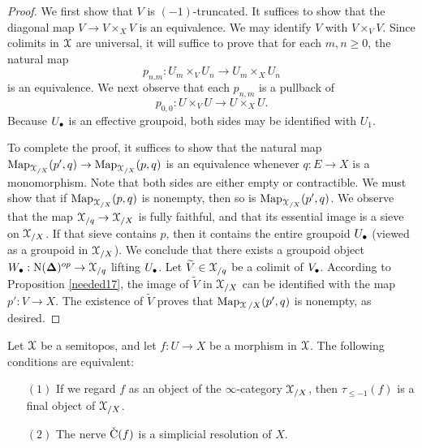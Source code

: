 \begin{proof}
We first show that $V$ is $(-1)$-truncated. It suffices to show
that the diagonal map $V \rightarrow V \times_{X} V$ is an
equivalence. We may identify $V$ with $V \times_{V} V$.
Since colimits in $\operatorname{\mathcal{X}}$ are universal, it will suffice to prove
that for each $m,n \geq 0$, the natural map
$$ p_{n.m}: U_m \times_{V} U_n \rightarrow U_{m} \times_{X} U_{n}$$
is an equivalence. We next observe that each $p_{n,m}$ is a pullback of
$$ p_{0,0}: U \times_{V} U \rightarrow U \times_{X} U. $$
Because $U_{\bullet}$ is an effective groupoid, both sides may be identified with $U_{1}$.

To complete the proof, it suffices to show that the natural map $\operatorname{{Map}}_{\operatorname{\mathcal{X}}_{/X}}(p',q)
\rightarrow \operatorname{{Map}}_{\operatorname{\mathcal{X}}_{/X}}(p,q)$ is an equivalence whenever $q: E \rightarrow X$
is a monomorphism. Note that both sides are either empty or contractible. We must show that
if $\operatorname{{Map}}_{\operatorname{\mathcal{X}}_{/X}}(p,q)$ is nonempty, then so is $\operatorname{{Map}}_{\operatorname{\mathcal{X}}_{/X}}(p',q)$. 
We observe that the map $\operatorname{\mathcal{X}}_{/q} \rightarrow \operatorname{\mathcal{X}}_{/X}$ is fully faithful, 
and that its essential image is a sieve on $\operatorname{\mathcal{X}}_{/X}$. If that sieve contains $p$, then
it contains the entire groupoid $U_{\bullet}$ (viewed as a groupoid in $\operatorname{\mathcal{X}}_{/X}$).
We conclude that there exists a groupoid object $W_{\bullet}: \operatorname{N}(\operatorname{{\bf \Delta}})^{op} \rightarrow \operatorname{\mathcal{X}}_{/q}$ lifting $U_{\bullet}$. Let $\widetilde{V} \in \operatorname{\mathcal{X}}_{/q}$ be a colimit of
$V_{\bullet}$. According to Proposition \ref{needed17}, the image of $\widetilde{V}$ in $\operatorname{\mathcal{X}}_{/X}$ can be identified with the map $p': V \rightarrow X$. The existence of $\widetilde{V}$ 
proves that $\operatorname{{Map}}_{\operatorname{\mathcal{X}}{/X}}(p',q)$ is nonempty, as desired.
\end{proof}

\begin{corollary}\label{subobj}
Let $\operatorname{\mathcal{X}}$ be a semitopos, and let $f: U \rightarrow X$
be a morphism in $\operatorname{\mathcal{X}}$. The following conditions are equivalent:
\begin{itemize}
\item[$(1)$] If we regard $f$ as an object of the $\infty$-category $\operatorname{\mathcal{X}}_{/X}$, then
$\tau_{\leq -1}(f)$ is a final object of $\operatorname{\mathcal{X}}_{/X}$.
\item[$(2)$] The \Cech nerve $\operatorname{\check{C}}(f)$ is a simplicial resolution of $X$.
\end{itemize}
\end{corollary}

